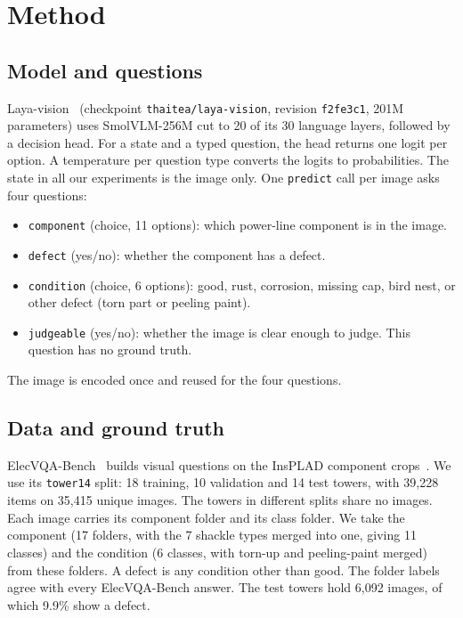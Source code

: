 \documentclass[preprint,12pt]{elsarticle}
\begin{document}
\section{Method}

\subsection{Model and questions}

Laya-vision~\cite{layavision} (checkpoint \texttt{thaitea/laya-vision}, revision \texttt{f2fe3c1}, 201M parameters) uses SmolVLM-256M cut to 20 of its 30 language layers, followed by a decision head. For a state and a typed question, the head returns one logit per option. A temperature per question type converts the logits to probabilities. The state in all our experiments is the image only. One \texttt{predict} call per image asks four questions:
\begin{itemize}
\item \texttt{component} (choice, 11 options): which power-line component is in the image.
\item \texttt{defect} (yes/no): whether the component has a defect.
\item \texttt{condition} (choice, 6 options): good, rust, corrosion, missing cap, bird nest, or other defect (torn part or peeling paint).
\item \texttt{judgeable} (yes/no): whether the image is clear enough to judge. This question has no ground truth.
\end{itemize}
The image is encoded once and reused for the four questions.

\subsection{Data and ground truth}

ElecVQA-Bench~\cite{elecvqa} builds visual questions on the InsPLAD component crops~\cite{insplad}. We use its \texttt{tower14} split: 18 training, 10 validation and 14 test towers, with 39,228 items on 35,415 unique images. The towers in different splits share no images. Each image carries its component folder and its class folder. We take the component (17 folders, with the 7 shackle types merged into one, giving 11 classes) and the condition (6 classes, with torn-up and peeling-paint merged) from these folders. A defect is any condition other than good. The folder labels agree with every ElecVQA-Bench answer. The test towers hold 6,092 images, of which 9.9\% show a defect.
\end{document}
